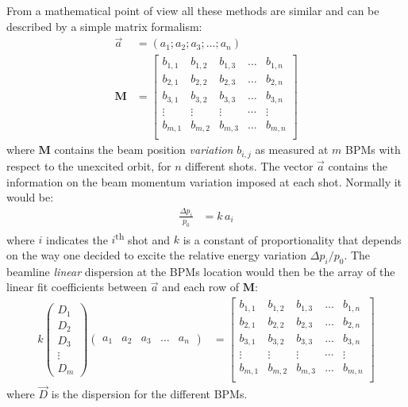 %
From a mathematical point of view all these methods are similar and can be described by a
simple matrix formalism:
%
\begin{align}
\vec{a} &= (a_1; a_2; a_3; \ldots; a_n) \\
%
\mathbf{M} &=
\begin{bmatrix}
   b_{1,1} & b_{1,2} & b_{1,3} & \ldots & b_{1,n} \\
   b_{2,1} & b_{2,2} & b_{2,3} & \ldots & b_{2,n} \\
   b_{3,1} & b_{3,2} & b_{3,3} & \ldots & b_{3,n} \\
   \vdots &\vdots &\vdots &\cdots &\vdots \\
   b_{m,1} & b_{m,2} & b_{m,3} & \ldots & b_{m,n} \\
\end{bmatrix}
\end{align}
%
where $\mathbf{M}$ contains the beam position \emph{variation} $b_{i,j}$ as measured at
$m$ BPMs with respect to the unexcited orbit, for  $n$ different shots.
The vector $\vec{a}$ contains the information on the beam momentum variation imposed at
each shot. Normally it would be:
%
\begin{align}
\frac{\Delta p_i}{p_0} &= k\,a_i
\label{eq:DispersionToScalingRelation}
\end{align}
%
where $i$ indicates the $i$\textsuperscript{th} shot and $k$ is a constant of
proportionality that depends on the way one decided to excite the relative energy
variation $\Delta p_i/p_0$.
%
The beamline \emph{linear} dispersion at the BPMs location would then be the array of the
linear fit coefficients between $\vec{a}$ and each row of $\mathbf{M}$:
%
\begin{align}
k
\begin{pmatrix}
D_1 \\
D_2 \\
D_3 \\
\vdots \\
D_m
\end{pmatrix}
%
\begin{pmatrix}
a_1 & a_2 & a_3 & \ldots & a_n 
\end{pmatrix}
&=
\begin{bmatrix}
   b_{1,1} & b_{1,2} & b_{1,3} & \ldots & b_{1,n} \\
   b_{2,1} & b_{2,2} & b_{2,3} & \ldots & b_{2,n} \\
   b_{3,1} & b_{3,2} & b_{3,3} & \ldots & b_{3,n} \\
   \vdots &\vdots &\vdots &\cdots &\vdots \\
   b_{m,1} & b_{m,2} & b_{m,3} & \ldots & b_{m,n} \\
\end{bmatrix}
\label{eq:generalFitDispersion}
\end{align}
%
where $\vec{D}$ is the dispersion for the different BPMs.

